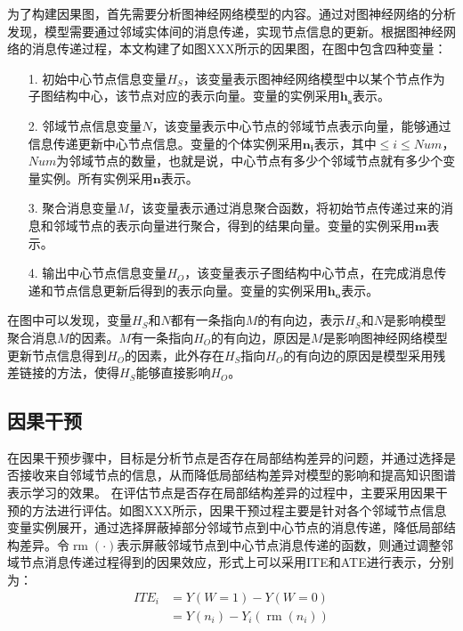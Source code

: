 \documentclass[algorithmlist, AutoFakeBold, AutoFakeSlant, figurelist, tablelist, nomlist, masters]{seuthesix}
\begin{document}
为了构建因果图，首先需要分析图神经网络模型的内容。通过对图神经网络的分析发现，模型需要通过邻域实体间的消息传递，实现节点信息的更新。根据图神经网络的消息传递过程，本文构建了如图XXX所示的因果图，在图中包含四种变量：
\begin{itemize}
  \item [1.] 初始中心节点信息变量$H_S$，该变量表示图神经网络模型中以某个节点作为子图结构中心，该节点对应的表示向量。变量的实例采用$\bm{h_s}$表示。
  \item [2.] 邻域节点信息变量$N$，该变量表示中心节点的邻域节点表示向量，能够通过信息传递更新中心节点信息。变量的个体实例采用$\bm{n_i}$表示，其中$\leq i \leq Num$，$Num$为邻域节点的数量，也就是说，中心节点有多少个邻域节点就有多少个变量实例。所有实例采用$\bm{n}$表示。
  \item [3.] 聚合消息变量$M$，该变量表示通过消息聚合函数，将初始节点传递过来的消息和邻域节点的表示向量进行聚合，得到的结果向量。变量的实例采用$\bm{m}$表示。
  \item [4.] 输出中心节点信息变量$H_O$，该变量表示子图结构中心节点，在完成消息传递和节点信息更新后得到的表示向量。变量的实例采用$\bm{h_o}$表示。
\end{itemize}
在图中可以发现，变量$H_S$和$N$都有一条指向$M$的有向边，表示$H_S$和$N$是影响模型聚合消息$M$的因素。$M$有一条指向$H_O$的有向边，原因是$M$是影响图神经网络模型更新节点信息得到$H_O$的因素，此外存在$H_S$指向$H_O$的有向边的原因是模型采用残差链接的方法，使得$H_S$能够直接影响$H_O$。

\subsection{因果干预}
在因果干预步骤中，目标是分析节点是否存在局部结构差异的问题，并通过选择是否接收来自邻域节点的信息，从而降低局部结构差异对模型的影响和提高知识图谱表示学习的效果。
在评估节点是否存在局部结构差异的过程中，主要采用因果干预的方法进行评估。如图XXX所示，因果干预过程主要是针对各个邻域节点信息变量实例展开，通过选择屏蔽掉部分邻域节点到中心节点的消息传递，降低局部结构差异。令$\operatorname{rm}(\cdot)$表示屏蔽邻域节点到中心节点消息传递的函数，则通过调整邻域节点消息传递过程得到的因果效应，形式上可以采用ITE和ATE进行表示，分别为：
\begin{equation}
  \begin{aligned}
    ITE_i & =Y(W=1) - Y(W=0) \\
    & =Y(n_i)-Y_i(\operatorname{rm}(n_i))
  \end{aligned}
  \label{equation_CausalInterventionITE}
\end{equation}
\end{document}
